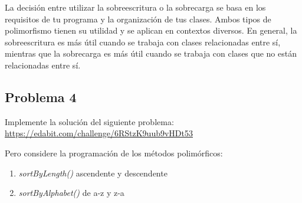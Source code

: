\documentclass[11pt, twocolumn]{article}
\begin{document}
  La decisión entre utilizar la sobreescritura o la sobrecarga se basa en los requisitos de tu programa y la organización de tus clases. Ambos tipos de polimorfismo tienen su utilidad y se aplican en contextos diversos. En general, la sobreescritura es más útil cuando se trabaja con clases relacionadas entre sí, mientras que la sobrecarga es más útil cuando se trabaja con clases que no están relacionadas entre sí.

  \subsection*{Problema 4}
  Implemente la solución del siguiente problema: \url{https://edabit.com/challenge/6RStzK9uub9vHDt53}

  Pero considere la programación de los métodos polimórficos:

  \begin{enumerate}[label=\alph*.]
    \item \textit{sortByLength()} ascendente y descendente
    \item \textit{sortByAlphabet()} de a-z y z-a
  \end{enumerate}
\end{document}
